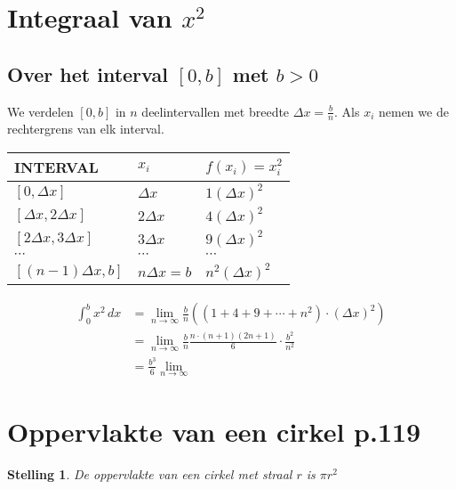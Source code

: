 \documentclass{article}
\newtheorem*{Stelling}{Stelling}
\begin{document}
\section{Integraal van $x^2$}
\subsection{Over het interval $\left[0,b\right]$ met $b>0$}
We verdelen $\left[0,b\right]$ in $n$ deelintervallen met breedte $\Delta x = \frac{b}{n}.$ Als $x_i$ nemen we de rechtergrens van elk interval.
\begin{center}
  \begin{tabularx}{\textwidth}{| >{\centering\arraybackslash}X | >{\centering\arraybackslash}X | >{\centering\arraybackslash}X|}
    \hline
    INTERVAL & $x_i$ & $f\left(x_i\right) = x_i^2$\\
    \hline
    \hline
    $\left[0, \Delta x\right]$ & $\Delta x$ & $1\left(\Delta x\right)^2$\\
   \hline
    $\left[\Delta x, 2\Delta x\right]$ & $2\Delta x$ & $4\left(\Delta x\right)^2$\\
    \hline
    $\left[2\Delta x, 3\Delta x\right]$ & $3\Delta x$ & $9\left(\Delta x\right)^2$\\
    \hline
    $\cdots$ &$\cdots$ &$\cdots$\\
    \hline
    $\left[\left(n-1\right)\Delta x, b\right]$ & $n\Delta x = b$ & $n^2\left(\Delta x\right)^2$\\
    \hline
  \end{tabularx}
\end{center}

\begin{align*}
  \displaystyle\int_{0}^{b}x^2\, dx &= \lim_{n\to\infty}\frac{b}{n}\left(\left(1+4+9+\cdots+n^2\right)\cdot\left(\Delta x\right)^2\right)\\
                                    &=\lim_{n\to\infty}\frac{b}{n}\frac{n\cdot\left(n+1\right)\left(2n+1\right)}{6}\cdot \frac{b^2}{n^2}\\
                                    &=\frac{b^3}{6}\lim_{n\to\infty}
\end{align*}
\section{Oppervlakte van een cirkel p.119}
\begin{Stelling}
    De oppervlakte van een cirkel met straal $r$ is $\pi r^2$
\end{Stelling}
\end{document}
